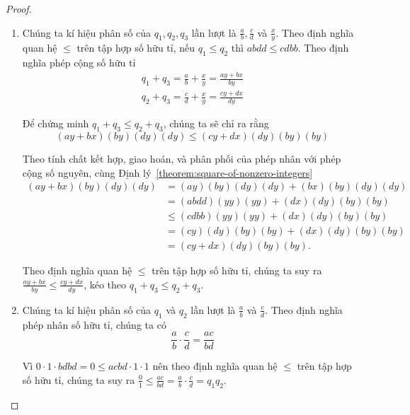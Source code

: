 \begin{proof}
    \begin{enumerate}[label={(\roman*)}]
        \item Chúng ta kí hiệu phân số của $q_{1}, q_{2}, q_{3}$ lần lượt là $\frac{a}{b}, \frac{c}{d}$ và $\frac{x}{y}$. Theo định nghĩa quan hệ $\leq$ trên tập hợp số hữu tỉ, nếu $q_{1}\leq q_{2}$ thì $abdd\leq cdbb$. Theo định nghĩa phép cộng số hữu tỉ
              \[
                  \begin{split}
                      q_{1} + q_{3} = \frac{a}{b} + \frac{x}{y} = \frac{ay + bx}{by} \\
                      q_{2} + q_{3} = \frac{c}{d} + \frac{x}{y} = \frac{cy + dx}{dy}
                  \end{split}
              \]

              Để chứng minh $q_{1} + q_{3}\leq q_{2} + q_{3}$, chúng ta sẽ chỉ ra rằng
              \[
                  (ay + bx)(by)(dy)(dy)\leq (cy + dx)(dy)(by)(by)
              \]

              Theo tính chất kết hợp, giao hoán, và phân phối của phép nhân với phép cộng số nguyên, cùng Định lý~\ref{theorem:square-of-nonzero-integers}
              \begin{align*}
                  (ay + bx)(by)(dy)(dy) & = (ay)(by)(dy)(dy) + (bx)(by)(dy)(dy)  \\
                                        & = (abdd)(yy)(yy) + (dx)(dy)(by)(by)    \\
                                        & \leq (cdbb)(yy)(yy) + (dx)(dy)(by)(by) \\
                                        & = (cy)(dy)(by)(by) + (dx)(dy)(by)(by)  \\
                                        & = (cy + dx)(dy)(by)(by).
              \end{align*}

              Theo định nghĩa quan hệ $\leq$ trên tập hợp số hữu tỉ, chúng ta suy ra $\frac{ay + bx}{by}\leq \frac{cy + dx}{dy}$, kéo theo $q_{1} + q_{3}\leq q_{2} + q_{3}$.
        \item Chúng ta kí hiệu phân số của $q_{1}$ và $q_{2}$ lần lượt là $\frac{a}{b}$ và $\frac{c}{d}$. Theo định nghĩa phép nhân số hữu tỉ, chúng ta có
              \[
                  \frac{a}{b}\cdot \frac{c}{d} = \frac{ac}{bd}
              \]

              Vì $0\cdot 1\cdot bdbd = 0 \leq acbd\cdot 1\cdot 1$ nên theo định nghĩa quan hệ $\leq$ trên tập hợp số hữu tỉ, chúng ta suy ra $\frac{0}{1}\leq \frac{ac}{bd} = \frac{a}{b}\cdot\frac{c}{d} = q_{1}q_{2}$.
    \end{enumerate}
\end{proof}

